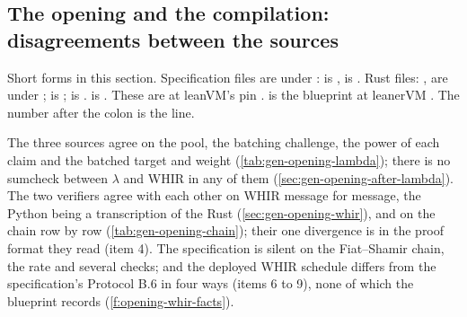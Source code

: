 \subsection{The opening and the compilation: disagreements between the sources}\label{sec:gen-opening-disagreements}

\begin{sloppypar}
Short forms in this section. Specification files are under :  is
,  is . Rust
files: ,  are under ;  is
;  is . 
is . These are at leanVM's pin .  is the
blueprint at leanerVM . The number after the colon is the line.
\end{sloppypar}

The three sources agree on the pool, the batching challenge, the power of each claim and the
batched target and weight (\cref{tab:gen-opening-lambda}); there is no sumcheck between $λ$ and
WHIR in any of them (\cref{sec:gen-opening-after-lambda}). The two verifiers agree with each other
on WHIR message for message, the Python being a transcription of the Rust
(\cref{sec:gen-opening-whir}), and on the chain row by row (\cref{tab:gen-opening-chain}); their
one divergence is in the proof format they read (item 4). The specification is silent on the
Fiat--Shamir chain, the rate and several checks; and the deployed WHIR schedule differs from the
specification's Protocol B.6 in four ways (items 6 to 9), none of which the blueprint records
(\cref{f:opening-whir-facts}).

